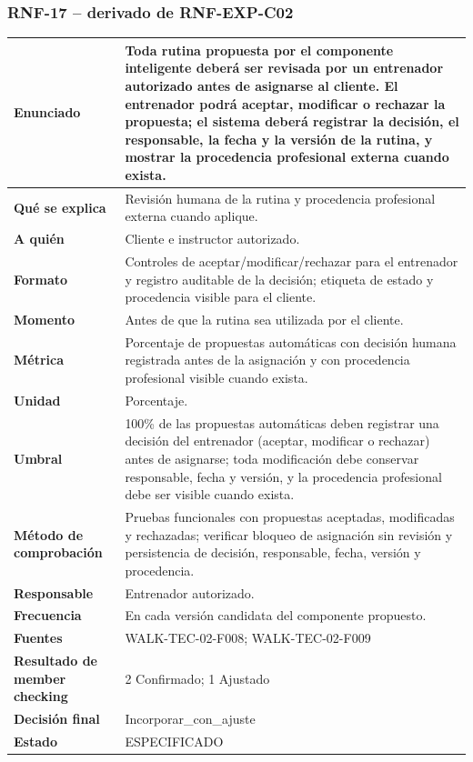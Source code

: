 \documentclass[11pt,a4paper,twoside]{article}
\begin{document}
\subsubsection{RNF-17 -- derivado de RNF-EXP-C02}
\begin{tabularx}{\textwidth}{|>{\bfseries}p{4.0cm}|X|}\hline
Enunciado & Toda rutina propuesta por el componente inteligente deberá ser revisada por un entrenador autorizado antes de asignarse al cliente. El entrenador podrá aceptar, modificar o rechazar la propuesta; el sistema deberá registrar la decisión, el responsable, la fecha y la versión de la rutina, y mostrar la procedencia profesional externa cuando exista. \\ \hline
Qué se explica & Revisión humana de la rutina y procedencia profesional externa cuando aplique. \\ \hline
A quién & Cliente e instructor autorizado. \\ \hline
Formato & Controles de aceptar/modificar/rechazar para el entrenador y registro auditable de la decisión; etiqueta de estado y procedencia visible para el cliente. \\ \hline
Momento & Antes de que la rutina sea utilizada por el cliente. \\ \hline
Métrica & Porcentaje de propuestas automáticas con decisión humana registrada antes de la asignación y con procedencia profesional visible cuando exista. \\ \hline
Unidad & Porcentaje. \\ \hline
Umbral & 100\% de las propuestas automáticas deben registrar una decisión del entrenador (aceptar, modificar o rechazar) antes de asignarse; toda modificación debe conservar responsable, fecha y versión, y la procedencia profesional debe ser visible cuando exista. \\ \hline
Método de comprobación & Pruebas funcionales con propuestas aceptadas, modificadas y rechazadas; verificar bloqueo de asignación sin revisión y persistencia de decisión, responsable, fecha, versión y procedencia. \\ \hline
Responsable & Entrenador autorizado. \\ \hline
Frecuencia & En cada versión candidata del componente propuesto. \\ \hline
Fuentes & WALK-TEC-02-F008; WALK-TEC-02-F009 \\ \hline
Resultado de member checking & 2 Confirmado; 1 Ajustado \\ \hline
Decisión final & Incorporar\_con\_ajuste \\ \hline
Estado & ESPECIFICADO \\ \hline
\end{tabularx}
\end{document}
